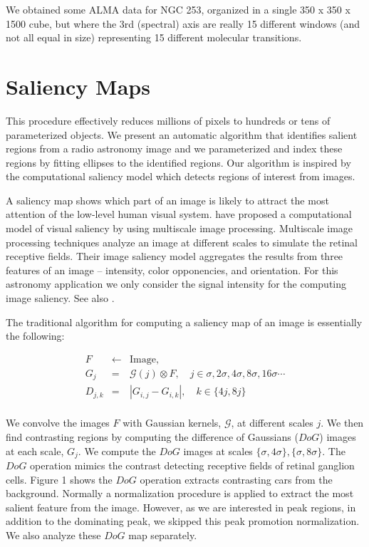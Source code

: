 We obtained some ALMA data for NGC 253, organized in a single 350 x 350 x 1500 cube, but where the 3rd (spectral) axis are really 15 different windows (and not all equal in size) representing 15 different molecular transitions.


\section{Saliency Maps}

This procedure effectively reduces millions of pixels to hundreds or tens of parameterized objects.  We present an automatic algorithm that identifies salient regions from a radio astronomy image and we parameterized and index these regions by fitting ellipses to the identified regions.  Our algorithm is inspired by the computational saliency model which detects regions of interest from images.


A saliency map shows which part of an image is likely to attract the most attention of the low-level human visual system. \cite{itti98:_model_of_salien_based_visual} have proposed a computational model of visual saliency by using multiscale image processing.  Multiscale image processing techniques analyze an image at different scales to simulate the retinal receptive fields.  Their image saliency model aggregates the results from three features of an image -- intensity, color opponencies, and orientation. For this astronomy application we only consider the signal intensity for the computing image saliency. See also \citep{ip2012hierarchical}.

The traditional algorithm for computing a saliency map of an image is essentially the following:

\begin{eqnarray*}
  \label{eqn:sal}
  F      & \leftarrow & \mathrm{Image}, \\
  G_{j}   & =          & \mathcal{G}(j) \otimes F, \quad j \in{\sigma,2\sigma,4\sigma,8\sigma,16\sigma
 \cdots}\\
  D_{j,k}  & =         & |G_{i,j} - G_{i,k}|, \quad k \in \{4j,8j\}\\
\end{eqnarray*}


We convolve the images $F$ with Gaussian kernels, $\mathcal{G}$, at different scales $j$.  We then find contrasting regions by computing the difference of Gaussians ($DoG$) images at each scale, $G_{j}$.  We compute the $DoG$ images at scales $\{\sigma,4\sigma\}, \{\sigma,8\sigma\}$.  The $DoG$ operation mimics the contrast detecting receptive fields of retinal ganglion cells.  Figure 1 shows the $DoG$ operation extracts contrasting cars from the background.  Normally a normalization procedure is applied to extract the most salient feature from the image.  However, as we are interested in peak regions, in addition to the dominating peak, we skipped this peak promotion normalization.  We also analyze these $DoG$ map separately.

